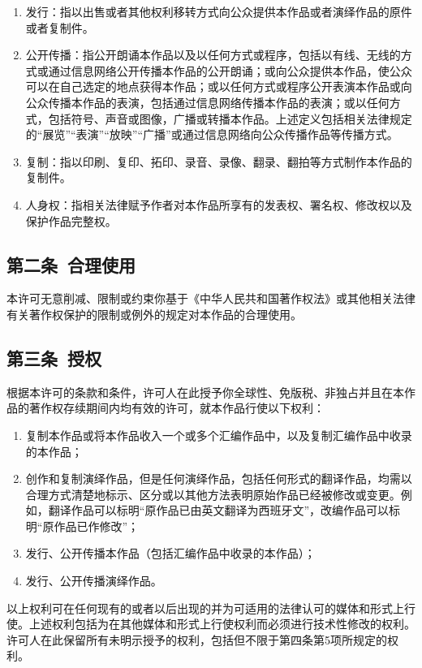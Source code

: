 \begin{enumerate}
	\item 发行：指以出售或者其他权利移转方式向公众提供本作品或者演绎作品的原件或者复制件。
	\item 公开传播：指公开朗诵本作品以及以任何方式或程序，包括以有线、无线的方式或通过信息网络公开传播本作品的公开朗诵；或向公众提供本作品，使公众可以在自己选定的地点获得本作品；或以任何方式或程序公开表演本作品或向公众传播本作品的表演，包括通过信息网络传播本作品的表演；或以任何方式，包括符号、声音或图像，广播或转播本作品。上述定义包括相关法律规定的“展览”“表演”“放映”“广播”或通过信息网络向公众传播作品等传播方式。
	\item 复制：指以印刷、复印、拓印、录音、录像、翻录、翻拍等方式制作本作品的复制件。
	\item 人身权：指相关法律赋予作者对本作品所享有的发表权、署名权、修改权以及保护作品完整权。
\end{enumerate}
\subsection{第二条\ 合理使用}
本许可无意削减、限制或约束你基于《中华人民共和国著作权法》或其他相关法律有关著作权保护的限制或例外的规定对本作品的合理使用。
\subsection{第三条\ 授权}
根据本许可的条款和条件，许可人在此授予你全球性、免版税、非独占并且在本作品的著作权存续期间内均有效的许可，就本作品行使以下权利：
\begin{enumerate}
	\item 复制本作品或将本作品收入一个或多个汇编作品中，以及复制汇编作品中收录的本作品；
	\item 创作和复制演绎作品，但是任何演绎作品，包括任何形式的翻译作品，均需以合理方式清楚地标示、区分或以其他方法表明原始作品已经被修改或变更。例如，翻译作品可以标明“原作品已由英文翻译为西班牙文”，改编作品可以标明“原作品已作修改”；
	\item 发行、公开传播本作品（包括汇编作品中收录的本作品）； 
	\item 发行、公开传播演绎作品。
\end{enumerate}
以上权利可在任何现有的或者以后出现的并为可适用的法律认可的媒体和形式上行使。上述权利包括为在其他媒体和形式上行使权利而必须进行技术性修改的权利。许可人在此保留所有未明示授予的权利，包括但不限于第四条第5项所规定的权利。

